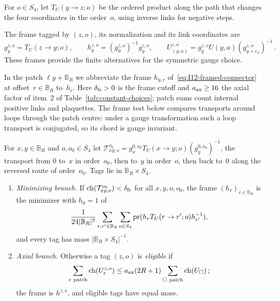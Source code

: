 For $o\in S_4$, let $T_U(y\to z;o)$ be the ordered product along the path that changes the four coordinates in the order~$o$, using inverse links for negative steps.
\begin{definition}\label{def:D20a}
The frame tagged by $(z,o)$, its normalization and its link coordinates are
\begin{equation*}
g_y^{z,o}=T_U(z\to y;o),\qquad h_y^{z,o}=(g_0^{z,o})^{-1}g_y^{z,o},\qquad
U_{(y,a)}^{z,o}=g_y^{z,o}U(y,a)(g_{y+e_a}^{z,o})^{-1}\,.
\end{equation*}
These frames provide the finite alternatives for the symmetric gauge choice.
\end{definition}

In the patch $\ell y+\mathbb B_R$ we abbreviate the frame $h_{y,r}$ of~\eqref{eq:I12-framed-connector} at offset~$r\in\mathbb B_R$ to~$h_r$. Here $\delta_{\rm fr}>0$ is the frame cutoff and $a_{\rm ax}\ge16$ the axial factor of item~2 of Table~\ref{tab:constant-choices}; patch sums count internal positive links and plaquettes. The frame test below compares transports around loops through the patch centre: under a gauge transformation such a loop transport is conjugated, so its chord is gauge invariant.
\begin{definition}\label{def:D20b}
For $x,y\in\mathbb B_R$ and $o,o_0\in S_4$ let $\mathcal T_{xy;o}^{o_0}=g_x^{0,o_0}T_U(x\to y;o)(g_y^{0,o_0})^{-1}$, the transport from $0$ to~$x$ in order~$o_0$, then to~$y$ in order~$o$, then back to~$0$ along the reversed route of order~$o_0$. Tags lie in $\mathbb B_R\times S_4$.
\begin{enumerate}[label=(\alph*)]
\item\emph{Minimizing branch.} If $\operatorname{ch}(\mathcal T_{xy;o}^{o_0})<\delta_{\rm fr}$ for all $x,y,o,o_0$, the frame $(h_r)_{r\in\mathbb B_R}$ is the minimizer with $h_0=1$ of
\begin{equation*}
\frac1{24|\mathbb B_R|^2}\sum_{r,r'\in\mathbb B_R}\sum_{o\in S_4}
\operatorname{pr}(h_rT_U(r\to r';o)h_{r'}^{-1}),
\end{equation*}
and every tag has mass $|\mathbb B_R\times S_4|^{-1}$.
\item\emph{Axial branch.} Otherwise a tag $(z,o)$ is \emph{eligible} if
\begin{equation*}
\sum_{e\ {\rm patch}}\operatorname{ch}(U_e^{z,o})\le a_{\rm ax}(2R+1)\sum_{\square\ {\rm patch}}\operatorname{ch}(U_\square)\,;
\end{equation*}
the frame is $h^{z,o}$, and eligible tags have equal mass.
\end{enumerate}
\end{definition}

